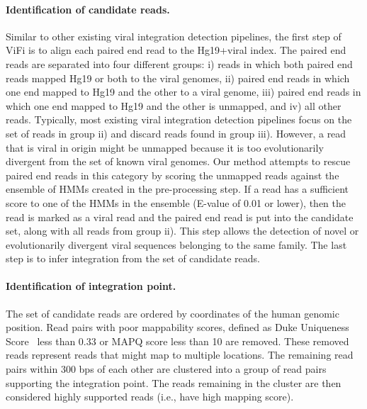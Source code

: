 \documentclass[12pt]{article}
\begin{document}
\paragraph{\textbf{Identification of candidate reads.}} Similar to other existing viral integration detection pipelines, the first step of ViFi is to align each paired end read to the Hg19+viral index.  The paired end reads are separated into four different groups: i) reads in which both paired end reads mapped Hg19 or both to the viral genomes, ii) paired end reads in which one end mapped to Hg19 and the other to a viral genome, iii) paired end reads in which one end mapped to Hg19 and the other is unmapped, and iv) all other reads.  Typically, most existing viral integration detection pipelines focus on the set of reads in group ii) and discard reads found in group iii).  However, a read that is viral in origin might be unmapped because it is too evolutionarily divergent from the set of known viral genomes.  Our method attempts to rescue paired end reads in this category by scoring the unmapped reads against the ensemble of HMMs created in the pre-processing step.  If a read has a sufficient score to one of the HMMs in the ensemble (E-value of 0.01 or lower), then the read is marked as a viral read and the paired end read is put into the candidate set, along with all reads from group ii).  This step allows the detection of novel or evolutionarily divergent viral sequences belonging to the same family.  The last step is to infer integration from the set of candidate reads.  

\paragraph{\textbf{Identification of integration point.}}  The set of candidate reads are ordered by coordinates of the human genomic position.  Read pairs with poor mappability scores, defined as Duke Uniqueness Score~\cite{unknown} less than 0.33 or MAPQ score less than 10 are removed.  These removed reads represent reads that might map to multiple locations.  The remaining read pairs within 300 bps of each other are clustered into a group of read pairs supporting the integration point.  The reads remaining in the cluster are then considered highly supported reads (i.e., have high mapping score).  

\end{document}
